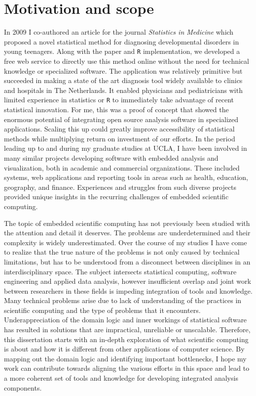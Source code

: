 \section{Motivation and scope}

In 2009 I co-authored an article for the journal \emph{Statistics in Medicine} \citep{van2009stage} which proposed a novel statistical method for diagnosing developmental disorders in young teenagers. Along with the paper and \texttt{R} implementation, we developed a free web service to directly use this method online without the need for technical knowledge or specialized software. The application was relatively primitive but succeeded in making a state of the art diagnosis tool widely available to clinics and hospitals in The Netherlands. It enabled physicians and pediatricians with limited experience in statistics or \texttt{R} to immediately take advantage of recent statistical innovation. For me, this was a proof of concept that showed the enormous potential of integrating open source analysis software in specialized applications. Scaling this up could greatly improve accessibility of statistical methods while multiplying return on investment of our efforts. In the period leading up to and during my graduate studies at UCLA, I have been involved in many similar projects developing software with embedded analysis and visualization, both in academic and commercial organizations. These included systems, web applications and reporting tools in areas such as health, education, geography, and finance. Experiences and struggles from such diverse projects provided unique insights in the recurring challenges of embedded scientific computing.%

The topic of embedded scientific computing has not previously been studied with the attention and detail it deserves. The problems are underdetermined and their complexity is widely underestimated. Over the course of my studies I have come to realize that the true nature of the problems is not only caused by technical limitations, but has to be understood from a disconnect between disciplines in an interdisciplinary space. The subject intersects statistical computing, software engineering and applied data analysis, however insufficient overlap and joint work between researchers in these fields is impeding integration of tools and knowledge. Many technical problems arise due to lack of understanding of the practices in scientific computing and the type of problems that it encounters. Underappreciation of the domain logic and inner workings of statistical software has resulted in solutions that are impractical, unreliable or unscalable. Therefore, this dissertation starts with an in-depth exploration of what scientific computing is about and how it is different from other applications of computer science. By mapping out the domain logic and identifying important bottlenecks, I hope my work can contribute towards aligning the various efforts in this space and lead to a more coherent set of tools and knowledge for developing integrated analysis components. 

